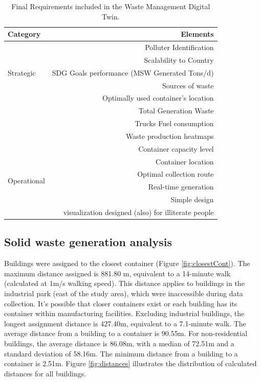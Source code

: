 \documentclass[authoryear,preprint,review,doubleblind, 12pt]{elsarticle}
\begin{document}
    \begin{table}[h!]
        \centering
        \caption{Final Requirements included in the Waste Management Digital Twin.}
        \scriptsize
        \label{tab:finalReq}
        \begin{tabularx}{\linewidth}{X r}
            \toprule
            Category&Elements\\
            \midrule
            \multirow{5}{*}{Strategic}&Polluter Identification\\
                                        &Scalability to Country\\
                                        &SDG Goals performance (MSW Generated Tons/d)\\
                                        &Sources of waste\\
            \midrule
            \multirow{4}{*}{Performance}&Optimally used container's location\\
                                        &Total Generation Waste\\
                                        &Trucks Fuel consumption\\
                                        &Waste production heatmaps\\
            \midrule
            \multirow{6}{*}{Operational}&Container capacity level\\
                                        &Container location\\
                                        &Optimal collection route\\
                                        &Real-time generation\\
                                        &Simple design\\
                                        & visualization designed (also) for illiterate people\\
            \bottomrule        
        \end{tabularx}
    \end{table}


    \subsection{Solid waste generation analysis} \label{subsec:SolidWasteGen}
   Buildings were assigned to the closest container (Figure \ref{fig:closestCont}). The maximum distance assigned is 881.80 m, equivalent to a 14-minute walk (calculated at 1m/s walking speed). This distance applies to buildings in the industrial park (east of the study area), which were inaccessible during data collection. It's possible that closer containers exist or each building has its container within manufacturing facilities. Excluding industrial buildings, the longest assignment distance is 427.40m, equivalent to a 7.1-minute walk. The average distance from a building to a container is 90.55m. For non-residential buildings, the average distance is 86.08m, with a median of 72.51m and a standard deviation of 58.16m. The minimum distance from a building to a container is 2.51m. Figure \ref{fig:distances} illustrates the distribution of calculated distances for all buildings.
\end{document}
